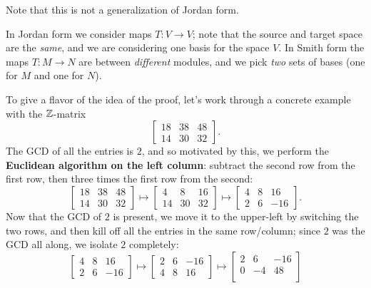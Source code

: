 \begin{remark}
	Note that this is not a generalization of Jordan form.
	\begin{itemize}
		\ii In Jordan form we consider maps $T \colon V \to V$;
		note that the source and target space are the \emph{same},
		and we are considering one basis for the space $V$.
		\ii In Smith form the maps $T \colon M \to N$ are between
		\emph{different} modules, and we pick \emph{two} sets of bases
		(one for $M$ and one for $N$).
	\end{itemize}
\end{remark}

\begin{example}
	To give a flavor of the idea of the proof,
	let's work through a concrete example with the $\mathbb Z$-matrix
	\[ \begin{bmatrix}
			18 & 38 & 48 \\
			14 & 30 & 32
		\end{bmatrix}.  \]
	The GCD of all the entries is $2$, and so motivated by this,
	we perform the \textbf{Euclidean algorithm on the left column}:
	subtract the second row from the first row,
	then three times the first row from the second:
	\[
		\begin{bmatrix}
			18 & 38 & 48 \\
			14 & 30 & 32
		\end{bmatrix}
		\mapsto
		\begin{bmatrix}
			4 & 8 & 16 \\
			14 & 30 & 32
		\end{bmatrix}
		\mapsto
		\begin{bmatrix}
			4 & 8 & 16 \\
			2 & 6 & -16
		\end{bmatrix}.
	\]
	Now that the GCD of $2$ is present, we move it to the upper-left
	by switching the two rows,
	and then kill off all the entries in the same row/column;
	since $2$ was the GCD all along, we isolate $2$ completely:
	\[
		\begin{bmatrix}
			4 & 8 & 16 \\
			2 & 6 & -16
		\end{bmatrix}
		\mapsto
		\begin{bmatrix}
			2 & 6 & -16 \\
			4 & 8 & 16
		\end{bmatrix}
		\mapsto
		\begin{bmatrix}
			2 & 6 & -16 \\
			0 & -4 & 48 \\

\end{bmatrix}\]
\end{example}
